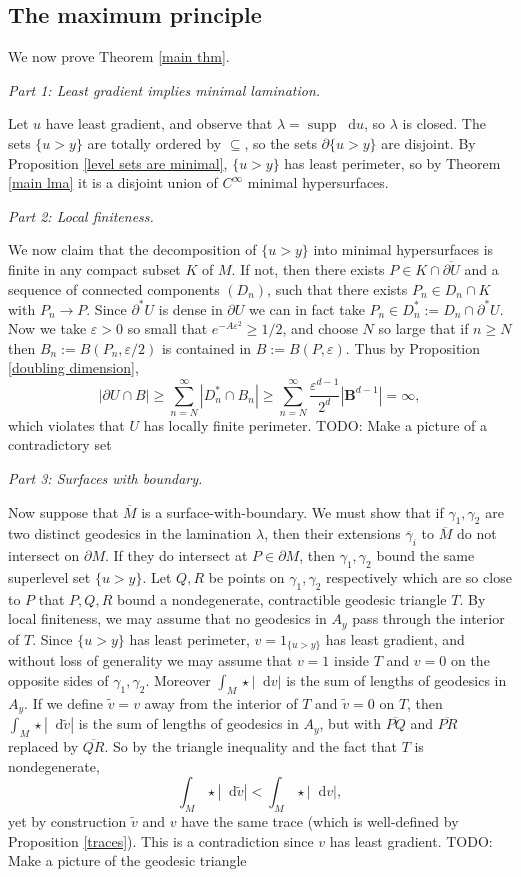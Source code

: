 \documentclass[reqno,10pt]{amsart}
\newcommand{\Ball}{\mathbf{B}}
\DeclareMathOperator{\supp}{supp}
\newcommand*\dif{\mathop{}\!\mathrm{d}}
\theoremstyle{definition}
\newcommand{\proofpart}[2]{%
  \par
  \addvspace{\medskipamount}%
  \noindent\emph{Part #1: #2.}
}
\numberwithin{equation}{section}
\begin{document}
\subsection{The maximum principle}
We now prove Theorem \ref{main thm}.

\proofpart{1}{Least gradient implies minimal lamination}
Let $u$ have least gradient, and observe that $\lambda = \supp \dif u$, so $\lambda$ is closed.
The sets $\{u > y\}$ are totally ordered by $\subseteq$, so the sets $\partial \{u > y\}$ are disjoint.
By Proposition \ref{level sets are minimal}, $\{u > y\}$ has least perimeter, so by Theorem \ref{main lma} it is a disjoint union of $C^\infty$ minimal hypersurfaces.

\proofpart{2}{Local finiteness}
We now claim that the decomposition of $\{u > y\}$ into minimal hypersurfaces is finite in any compact subset $K$ of $M$.
If not, then there exists $P \in K \cap \overline{\partial U}$ and a sequence of connected components $(D_n)$, such that there exists $P_n \in D_n \cap K$ with $P_n \to P$.
Since $\partial^* U$ is dense in $\partial U$ we can in fact take $P_n \in D_n^* := D_n \cap \partial^* U$.
Now we take $\varepsilon > 0$ so small that $e^{-A\varepsilon^2} \geq 1/2$, and choose $N$ so large that if $n \geq N$ then $B_n := B(P_n, \varepsilon/2)$ is contained in $B := B(P, \varepsilon)$.
Thus by Proposition \ref{doubling dimension},
$$|\partial U \cap B| \geq \sum_{n=N}^\infty |D_n^* \cap B_n| \geq \sum_{n=N}^\infty \frac{\varepsilon^{d - 1}}{2^d} |\Ball^{d - 1}| = \infty,$$
which violates that $U$ has locally finite perimeter. TODO: Make a picture of a contradictory set

\proofpart{3}{Surfaces with boundary}
Now suppose that $\overline M$ is a surface-with-boundary.
We must show that if $\gamma_1, \gamma_2$ are two distinct geodesics in the lamination $\lambda$, then their extensions $\overline \gamma_i$ to $\overline M$ do not intersect on $\partial M$.
If they do intersect at $P \in \partial M$, then $\gamma_1, \gamma_2$ bound the same superlevel set $\{u > y\}$.
Let $Q, R$ be points on $\gamma_1, \gamma_2$ respectively which are so close to $P$ that $P, Q, R$ bound a nondegenerate, contractible geodesic triangle $T$.
By local finiteness, we may assume that no geodesics in $A_y$ pass through the interior of $T$.
Since $\{u > y\}$ has least perimeter, $v = 1_{\{u > y\}}$ has least gradient, and without loss of generality we may assume that $v = 1$ inside $T$ and $v = 0$ on the opposite sides of $\gamma_1, \gamma_2$.
Moreover $\int_M \star |\dif v|$ is the sum of lengths of geodesics in $A_y$.
If we define $\tilde v = v$ away from the interior of $T$ and $\tilde v = 0$ on $T$, then $\int_M \star |\dif \tilde v|$ is the sum of lengths of geodesics in $A_y$, but with $\overline{PQ}$ and $\overline{PR}$ replaced by $\overline{QR}$.
So by the triangle inequality and the fact that $T$ is nondegenerate,
$$\int_M \star |\dif \tilde v| < \int_M \star |\dif v|,$$
yet by construction $\tilde v$ and $v$ have the same trace (which is well-defined by Proposition \ref{traces}).
This is a contradiction since $v$ has least gradient. TODO: Make a picture of the geodesic triangle
\end{document}
